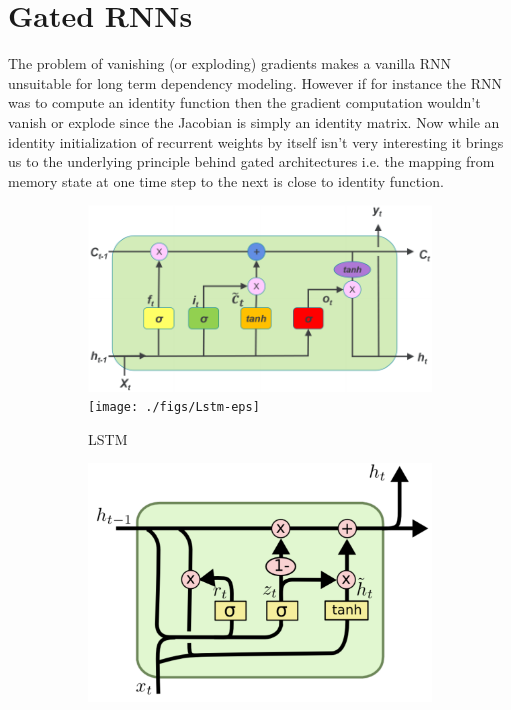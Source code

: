 \section{Gated RNNs}
The problem of vanishing (or exploding) gradients makes a vanilla RNN unsuitable for long term dependency modeling. However if for instance the RNN was to compute an identity function then the gradient computation wouldn't vanish or explode since the Jacobian is simply an identity matrix. Now while an identity initialization of recurrent weights by itself isn't very interesting it brings us to the underlying principle behind gated architectures i.e. the mapping from memory state at one time step to the next is close to identity function.

\begin{figure}[ht] 
	\begin{subfigure}[b]{0.5\linewidth}
		\centering
		\ifpdf
		\includegraphics[width=0.95\linewidth]{./figs/Lstm-pdf}
		\else
		\texttt{[image: ./figs/Lstm-eps]}
		\fi
		\caption{LSTM\citep{Zheng2017}}
		\label{lstm} 
		\vspace{4ex}
	\end{subfigure}%
	\begin{subfigure}[b]{0.5\linewidth}
		\centering
		\ifpdf
		\includegraphics[width=0.95\linewidth]{./figs/Gru-pdf}

\end{subfigure}
\end{figure}
